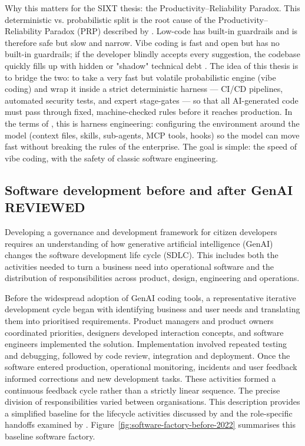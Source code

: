 \documentclass[10pt,a4paper]{article}
\begin{document}
Why this matters for the SIXT thesis: the Productivity–Reliability Paradox. This deterministic vs. probabilistic split is the root cause of the Productivity–Reliability Paradox (PRP) described by \textcite{farrag2026}. Low-code has built-in guardrails and is therefore safe but slow and narrow. Vibe coding is fast and open but has no built-in guardrails; if the developer blindly accepts every suggestion, the codebase quickly fills up with hidden or "shadow" technical debt \parencite{farrag2026,kobiella2026}. The idea of this thesis is to bridge the two: to take a very fast but volatile probabilistic engine (vibe coding) and wrap it inside a strict deterministic harness — CI/CD pipelines, automated security tests, and expert stage-gates — so that all AI-generated code must pass through fixed, machine-checked rules before it reaches production. In the terms of \textcite{galster2026}, this is harness engineering: configuring the environment around the model (context files, skills, sub-agents, MCP tools, hooks) so the model can move fast without breaking the rules of the enterprise. The goal is simple: the speed of vibe coding, with the safety of classic software engineering.

\subsection{Software development before and after GenAI REVIEWED}

Developing a governance and development framework for citizen developers requires an understanding of how generative artificial intelligence (GenAI) changes the software development life cycle (SDLC). This includes both the activities needed to turn a business need into operational software and the distribution of responsibilities across product, design, engineering and operations.

Before the widespread adoption of GenAI coding tools, a representative iterative development cycle began with identifying business and user needs and translating them into prioritised requirements. Product managers and product owners coordinated priorities, designers developed interaction concepts, and software engineers implemented the solution. Implementation involved repeated testing and debugging, followed by code review, integration and deployment. Once the software entered production, operational monitoring, incidents and user feedback informed corrections and new development tasks. These activities formed a continuous feedback cycle rather than a strictly linear sequence. The precise division of responsibilities varied between organisations. This description provides a simplified baseline for the lifecycle activities discussed by \textcite{mandl2026} and the role-specific handoffs examined by \textcite{li2026product}. Figure~\ref{fig:software-factory-before-2022} summarises this baseline software factory.
\end{document}
